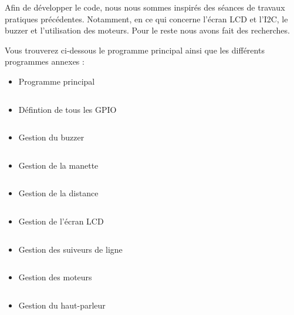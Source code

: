 Afin de développer le code, nous nous sommes inspirés des séances de travaux pratiques précédentes. Notamment, en ce qui concerne l'écran LCD et l'I2C, le buzzer et l'utilisation des moteurs. Pour le reste nous avons fait des recherches.

Vous trouverez ci-dessous le programme principal ainsi que les différents programmes annexes :

\begin{itemize}
    \item Programme principal
        \inputminted{c}{../code/src/main.c}
    \item Défintion de tous les GPIO
        \inputminted{c}{../code/include/gpioPins.h}
    \item Gestion du buzzer
        \inputminted{c}{../code/src/buzzer.c}
    \item Gestion de la manette
        \inputminted{c}{../code/src/controller.c}
    \item Gestion de la distance
        \inputminted{c}{../code/src/distance.c}
    \item Gestion de l'écran LCD
        \inputminted{c}{../code/src/i2cLCD.c}
    \item Gestion des suiveurs de ligne
        \inputminted{c}{../code/src/lineFinder.c}
    \item Gestion des moteurs
        \inputminted{c}{../code/src/motors.c}
    \item Gestion du haut-parleur
        \inputminted{c}{../code/src/speaker.c}
\end{itemize}

\newpage